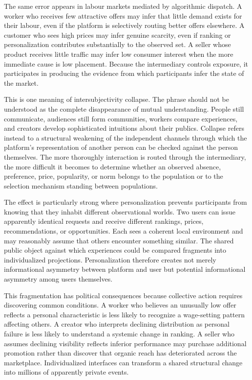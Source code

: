 \documentclass[11pt]{article}
\begin{document}
The same error appears in labour markets mediated by algorithmic dispatch. A worker who receives few attractive offers may infer that little demand exists for their labour, even if the platform is selectively routing better offers elsewhere. A customer who sees high prices may infer genuine scarcity, even if ranking or personalization contributes substantially to the observed set. A seller whose product receives little traffic may infer low consumer interest when the more immediate cause is low placement. Because the intermediary controls exposure, it participates in producing the evidence from which participants infer the state of the market.

This is one meaning of intersubjectivity collapse. The phrase should not be understood as the complete disappearance of mutual understanding. People still communicate, audiences still form communities, workers compare experiences, and creators develop sophisticated intuitions about their publics. Collapse refers instead to a structural weakening of the independent channels through which the platform's representation of another person can be checked against the person themselves. The more thoroughly interaction is routed through the intermediary, the more difficult it becomes to determine whether an observed absence, preference, price, popularity, or norm belongs to the population or to the selection mechanism standing between populations.

The effect is particularly strong where personalization prevents participants from knowing that they inhabit different observational worlds. Two users can issue apparently identical requests and receive different rankings, prices, recommendations, or opportunities. Each sees a coherent local environment and may reasonably assume that others encounter something similar. The shared public object against which experiences could be compared fragments into individualized projections. Personalization therefore creates not merely informational asymmetry between platform and user but potential informational asymmetry among users themselves.

This fragmentation has political consequences because collective action requires discovering common conditions. A worker who believes an unusually low offer reflects a personal characteristic is less likely to recognize a wage-setting pattern affecting others. A creator who interprets declining distribution as personal failure is less likely to understand a systemic change in ranking. A seller who assumes declining visibility reflects inferior performance may purchase additional promotion rather than discover that organic reach has deteriorated across the marketplace. Individualized interfaces can transform a shared structural change into millions of apparently private events.
\end{document}
